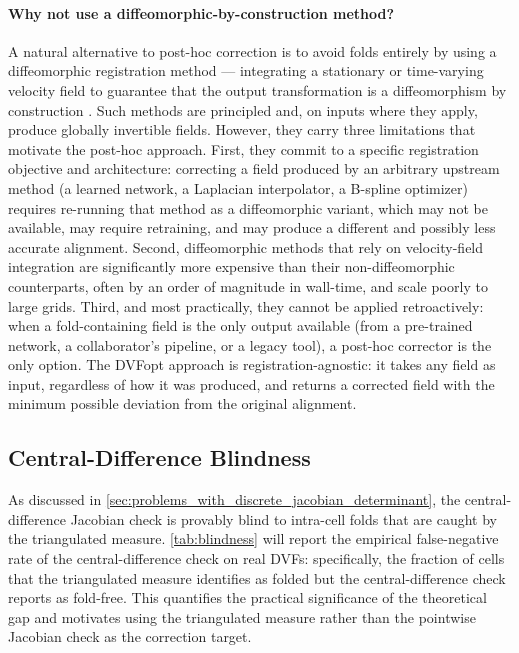 \paragraph{Why not use a diffeomorphic-by-construction method?}
A natural alternative to post-hoc correction is to avoid folds entirely by using a diffeomorphic registration method — integrating a stationary or time-varying velocity field to guarantee that the output transformation is a diffeomorphism by construction \cite{Dalca2018, AVANTS200826}. Such methods are principled and, on inputs where they apply, produce globally invertible fields. However, they carry three limitations that motivate the post-hoc approach. First, they commit to a specific registration objective and architecture: correcting a field produced by an arbitrary upstream method (a learned network, a Laplacian interpolator, a B-spline optimizer) requires re-running that method as a diffeomorphic variant, which may not be available, may require retraining, and may produce a different and possibly less accurate alignment. Second, diffeomorphic methods that rely on velocity-field integration are significantly more expensive than their non-diffeomorphic counterparts, often by an order of magnitude in wall-time, and scale poorly to large grids. Third, and most practically, they cannot be applied retroactively: when a fold-containing field is the only output available (from a pre-trained network, a collaborator's pipeline, or a legacy tool), a post-hoc corrector is the only option. The DVFopt approach is registration-agnostic: it takes any field as input, regardless of how it was produced, and returns a corrected field with the minimum possible deviation from the original alignment.

\subsection{Central-Difference Blindness}
\label{sec:blindness}

As discussed in \autoref{sec:problems_with_discrete_jacobian_determinant}, the central-difference Jacobian check is provably blind to intra-cell folds that are caught by the triangulated measure. \autoref{tab:blindness} will report the empirical false-negative rate of the central-difference check on real DVFs: specifically, the fraction of cells that the triangulated measure identifies as folded but the central-difference check reports as fold-free. This quantifies the practical significance of the theoretical gap and motivates using the triangulated measure rather than the pointwise Jacobian check as the correction target.


